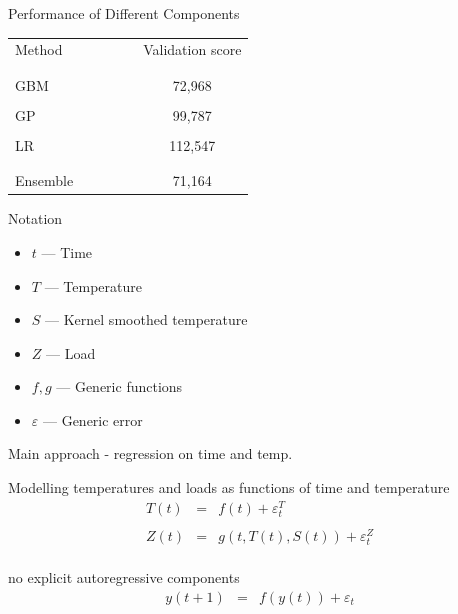 \begin{frame}{Performance of Different Components}
  \begin{center}
    \begin{tabular}{lcc|ccc}
      Method &&&&& Validation score\\\\
      \hline\\
      GBM &&&&& 72,968 \\\\
      GP &&&&& 99,787 \\\\
      LR &&&&& 112,547 \\\\
      \hline\\
      Ensemble &&&&& 71,164
    \end{tabular}
  \end{center}
\end{frame}

\begin{frame}{Notation}
    \begin{itemize}
      \item $t$ --- Time
      \vspace{\baselineskip}
      \item $T$ --- Temperature
      \vspace{\baselineskip}
      \item $S$ --- Kernel smoothed temperature
      \vspace{\baselineskip}
      \item $Z$ --- Load
      \vspace{\baselineskip}
      \item $f,g$ --- Generic functions
      \vspace{\baselineskip}
      \item $\varepsilon$ --- Generic error
    \end{itemize}
\end{frame}

\begin{frame}{Main approach - regression on time and temp.}
  \begin{block}{Modelling temperatures and loads as functions of time and temperature}
    \begin{eqnarray*}
      T(t) & = & f(t) + \varepsilon^T_t \\
      \\
      Z(t) & = & g(t, T(t), S(t)) + \varepsilon^Z_t \\
    \end{eqnarray*}
  \end{block}
  \begin{block}{\ie no explicit autoregressive components \eg}
    \begin{eqnarray*}
      y(t+1) & = & f(y(t)) + \varepsilon_t
    \end{eqnarray*}
  \end{block}
\end{frame}

